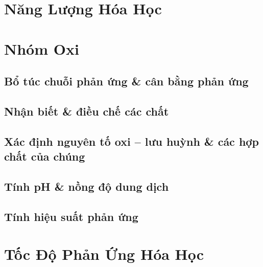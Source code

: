\documentclass{article}
\numberwithin{equation}{section}
\begin{document}
\section{Năng Lượng Hóa Học}


\section{Nhóm Oxi}

\subsection{Bổ túc chuỗi phản ứng \& cân bằng phản ứng}


\subsection{Nhận biết \& điều chế các chất}


\subsection{Xác định nguyên tố oxi -- lưu huỳnh \& các hợp chất của chúng}


\subsection{Tính pH \& nồng độ dung dịch }


\subsection{Tính hiệu suất phản ứng}


\section{Tốc Độ Phản Ứng Hóa Học}
\end{document}
